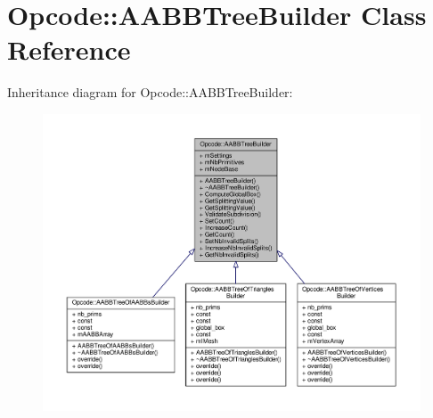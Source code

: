 \hypertarget{classOpcode_1_1AABBTreeBuilder}{}\section{Opcode\+:\+:A\+A\+B\+B\+Tree\+Builder Class Reference}
\label{classOpcode_1_1AABBTreeBuilder}


Inheritance diagram for Opcode\+:\+:A\+A\+B\+B\+Tree\+Builder\+:
\nopagebreak
\begin{figure}[H]
\begin{center}
\leavevmode
\includegraphics[width=350pt]{d6/d6b/classOpcode_1_1AABBTreeBuilder__inherit__graph}
\end{center}
\end{figure}


